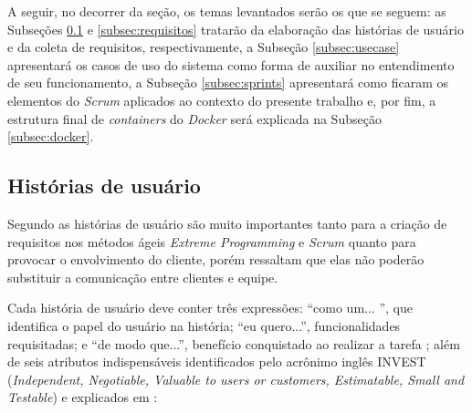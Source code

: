 A seguir, no decorrer da seção, os temas levantados serão os que se seguem: as Subseções \ref{subsec:historias} e \ref{subsec:requisitos} tratarão da elaboração das histórias de usuário e da coleta de requisitos, respectivamente, a Subseção \ref{subsec:usecase} apresentará os casos de uso do sistema como forma de auxiliar no entendimento de seu funcionamento, a Subseção \ref{subsec:sprints} apresentará como ficaram os elementos do \textit{Scrum} aplicados ao contexto do presente trabalho e, por fim, a estrutura final de \textit{containers} do \textit{Docker} será explicada na Subseção \ref{subsec:docker}.

\hspace{2.5cm}
\subsection{Histórias de usuário}
\label{subsec:historias}
\hspace{2.5cm}

Segundo  as histórias de usuário são muito importantes tanto para a criação de requisitos nos métodos ágeis \textit{Extreme Programming} e \textit{Scrum} quanto para provocar o envolvimento do cliente, porém  ressaltam que elas não poderão substituir a comunicação entre clientes e equipe.

Cada história de usuário deve conter três expressões: ``como um... '', que identifica o papel do usuário na história; ``eu quero...'', funcionalidades requisitadas; e ``de modo que...'', benefício conquistado ao realizar a tarefa ; além de seis atributos indispensáveis identificados pelo acrônimo inglês INVEST (\textit{Independent, Negotiable, Valuable to users or customers, Estimatable, Small and Testable}) \cite{cohn2004user} e explicados em :

